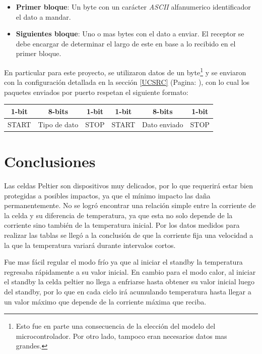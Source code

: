 \documentclass[10pt,spanish,a4paper,openany,notitlepage]{article}
\begin{document}
\begin{itemize}
\item \textbf{Primer bloque}: Un byte con un carácter \textit{ASCII} alfanumerico identificador el dato a mandar.
\item \textbf{Siguientes bloque}: Uno o mas bytes con el dato a enviar. El receptor se debe encargar de determinar el largo de este en base a lo recibido en el primer bloque.
\end{itemize}

En particular para este proyecto, se utilizaron datos de un byte\footnote{Esto fue en parte una consecuencia de la elección del modelo del microcontrolador. Por otro lado, tampoco eran necesarios datos mas grandes.} y se enviaron con la configuración detallada en la sección \ref{UCSRC} (Pagina: \pageref{UCSRC}), con lo cual los paquetes enviados por puerto respetan el siguiente formato:

\begin{center}
\begin{tabular}{|c|c|c|c|c|c|}\hline
1-bit&8-bits&1-bit&1-bit&8-bits&1-bit\\\hline
START&Tipo de dato&STOP&START&Dato enviado&STOP\\\hline
\end{tabular}
\end{center}


\section{Conclusiones}

Las celdas Peltier son dispositivos muy delicados, por lo que requerirá
estar bien protegidas a posibles impactos, ya que el mínimo impacto
las daña permanentemente. 
No se logró encontrar una relación simple entre la corriente de la celda
y su diferencia de temperatura, ya que esta no solo depende de la corriente
sino también de la temperatura inicial. Por los datos medidos para realizar
las tablas se llegó a la conclusión de que la corriente fija una velocidad
a la que la temperatura variará durante intervalos cortos.

Fue mas fácil regular el modo frío ya que al iniciar el standby la
temperatura regresaba rápidamente a su valor inicial. En cambio para el
modo calor, al iniciar el standby la celda peltier no llega a enfriarse
hasta obtener su valor inicial luego del standby, por lo que en cada ciclo
irá acumulando temperatura hasta llegar a un valor máximo que depende
de la corriente máxima que reciba.
\end{document}
